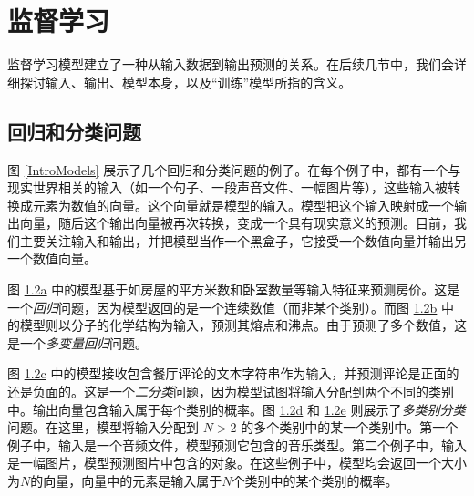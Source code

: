 \documentclass[lang=cn,newtx,10pt,scheme=chinese]{elegantbook}
\begin{document}
\section{监督学习}
监督学习模型建立了一种从输入数据到输出预测的关系。在后续几节中，我们会详细探讨输入、输出、模型本身，以及“训练”模型所指的含义。

\subsection{回归和分类问题}

图 \ref{IntroModels} 展示了几个回归和分类问题的例子。在每个例子中，都有一个与现实世界相关的输入（如一个句子、一段声音文件、一幅图片等），这些输入被转换成元素为数值的向量。这个向量就是模型的输入。模型把这个输入映射成一个输出向量，随后这个输出向量被再次转换，变成一个具有现实意义的预测。目前，我们主要关注输入和输出，并把模型当作一个黑盒子，它接受一个数值向量并输出另一个数值向量。

图 \hyperref[IntroModels]{1.2a} 中的模型基于如房屋的平方米数和卧室数量等输入特征来预测房价。这是一个\textit{回归}问题，因为模型返回的是一个连续数值（而非某个类别）。而图 \hyperref[IntroModels]{1.2b} 中的模型则以分子的化学结构为输入，预测其熔点和沸点。由于预测了多个数值，这是一个\textit{多变量回归}问题。

图 \hyperref[IntroModels]{1.2c} 中的模型接收包含餐厅评论的文本字符串作为输入，并预测评论是正面的还是负面的。这是一个\textit{二分类}问题，因为模型试图将输入分配到两个不同的类别中。输出向量包含输入属于每个类别的概率。图 \hyperref[IntroModels]{1.2d} 和 \hyperref[IntroModels]{1.2e} 则展示了\textit{多类别分类}问题。在这里，模型将输入分配到 $N > 2$ 的多个类别中的某一个类别中。第一个例子中，输入是一个音频文件，模型预测它包含的音乐类型。第二个例子中，输入是一幅图片，模型预测图片中包含的对象。在这些例子中，模型均会返回一个大小为$N$的向量，向量中的元素是输入属于$N$个类别中的某个类别的概率。
\end{document}
